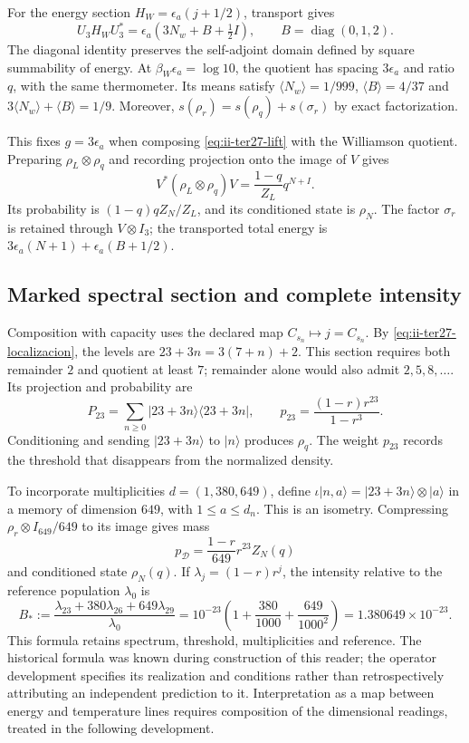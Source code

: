 For the energy section $H_W=\epsilon_a(j+1/2)$, transport gives
\[
 U_3H_WU_3^*=\epsilon_a(3N_w+B+\tfrac12I),
 \qquad B=\operatorname{diag}(0,1,2).
\]
The diagonal identity preserves the self-adjoint domain defined by
square summability of energy. At $\beta_W\epsilon_a=\log10$, the
quotient has spacing $3\epsilon_a$ and ratio $q$, with the same
thermometer. Its means satisfy $\langle N_w\rangle=1/999$,
$\langle B\rangle=4/37$ and
$3\langle N_w\rangle+\langle B\rangle=1/9$.
Moreover, $s(\rho_r)=s(\rho_q)+s(\sigma_r)$ by exact factorization.

This fixes $g=3\epsilon_a$ when composing \eqref{eq:ii-ter27-lift}
with the Williamson quotient. Preparing $\rho_L\otimes\rho_q$ and
recording projection onto the image of $V$ gives
\[
 V^*(\rho_L\otimes\rho_q)V=\frac{1-q}{Z_L}q^{N+I}.
\]
Its probability is $(1-q)qZ_N/Z_L$, and its conditioned state is
$\rho_N$. The factor $\sigma_r$ is retained through $V\otimes I_3$;
the transported total energy is
$3\epsilon_a(N+1)+\epsilon_a(B+1/2)$.

\subsection{Marked spectral section and complete intensity}
\label{sec:ii-ter27-marcador}

Composition with capacity uses the declared map
$C_{s_n}\mapsto j=C_{s_n}$. By \eqref{eq:ii-ter27-localizacion},
the levels are $23+3n=3(7+n)+2$. This section requires both remainder
$2$ and quotient at least $7$; remainder alone would also admit
$2,5,8,\ldots$. Its projection and probability are
\[
 P_{23}=\sum_{n\geq0}|23+3n\rangle\langle23+3n|,
 \qquad p_{23}=\frac{(1-r)r^{23}}{1-r^3}.
\]
Conditioning and sending $|23+3n\rangle$ to $|n\rangle$ produces
$\rho_q$. The weight $p_{23}$ records the threshold that disappears
from the normalized density.

To incorporate multiplicities $d=(1,380,649)$, define
$\iota|n,a\rangle=|23+3n\rangle\otimes|a\rangle$ in a memory of
dimension $649$, with $1\leq a\leq d_n$. This is an isometry.
Compressing $\rho_r\otimes I_{649}/649$ to its image gives mass
\[
 p_{\mathcal D}=\frac{1-r}{649}r^{23}Z_N(q)
\]
and conditioned state $\rho_N(q)$. If $\lambda_j=(1-r)r^j$, the
intensity relative to the reference population $\lambda_0$ is
\begin{equation}
 B_*:=\frac{\lambda_{23}+380\lambda_{26}+649\lambda_{29}}{\lambda_0}
 =10^{-23}\left(1+\frac{380}{1000}+\frac{649}{1000^2}\right)
 =1.380649\times10^{-23}.
 \label{eq:ii-ter27-intensidad}
\end{equation}
This formula retains spectrum, threshold, multiplicities and reference.
The historical formula was known during construction of this reader;
the operator development specifies its realization and conditions rather
than retrospectively attributing an independent prediction to it.
Interpretation as a map between energy and temperature lines requires
composition of the dimensional readings, treated in the following development.

